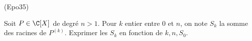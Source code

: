 \begin{tiny}(Epo35)\end{tiny} Soit $P\in \C[X]$ de degré $n>1$. Pour $k$ entier entre $0$ et $n$, on note $S_k$ la somme des racines de $P^{(k)}$. Exprimer les $S_k$ en fonction de $k, n, S_0$. 